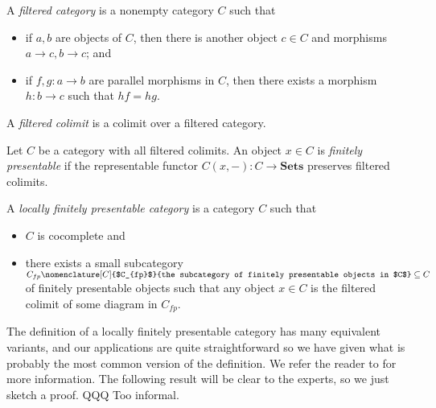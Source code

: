 \documentclass{amsbook} %
\newcommand{\cn}{\colon}
\newcommand{\mb}{\mathbf}
\numberwithin{section}{chapter}
\begin{document}
\begin{Defi}
A \textit{filtered category} is a nonempty category $C$ such that
\begin{itemize}
\item if $a,b$ are objects of $C$, then there is another object $c \in C$ and morphisms $a \to c, b \to c$; and
\item if $f,g \cn a \to b$ are parallel morphisms in $C$, then there exists a morphism $h \cn b \to c$ such that $hf = hg$.
\end{itemize}
\end{Defi}

\begin{Defi}
A \emph{filtered colimit} is a colimit over a filtered category.
\end{Defi}

\begin{Defi}
Let $C$ be a category with all filtered colimits.  An object $x \in C$ is \textit{finitely presentable} if the representable functor $C(x, -):C \rightarrow \mb{Sets}$ preserves filtered colimits.
\end{Defi}

\begin{Defi}
A \textit{locally finitely presentable category} is a category $C$ such that
\begin{itemize}
\item $C$ is cocomplete and
\item there exists a small subcategory $C_{fp}\nomenclature[C]{$C_{fp}$}{the subcategory of finitely presentable objects in $C$} \subseteq C$ of finitely presentable objects such that any object $x \in C$ is the filtered colimit of some diagram in $C_{fp}$.
\end{itemize}
\end{Defi}


The definition of a locally finitely presentable category has many equivalent variants, and our applications are quite straightforward so we have given what is probably the most common version of the definition.  We refer the reader to \cite{ar} for more information.  The following result will be clear to the experts, so we just sketch a proof. QQQ Too informal.
\end{document}
